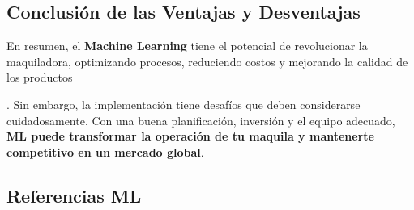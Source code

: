 \documentclass[
  10pt,
  letterpaper,
]{book}
\begin{document}
\subsection{Conclusión de las Ventajas y
Desventajas}\label{conclusiuxf3n-de-las-ventajas-y-desventajas}

En resumen, el \textbf{Machine Learning} tiene el potencial de
revolucionar la maquiladora, optimizando procesos, reduciendo costos y
mejorando la calidad de los productos

. Sin embargo, la implementación tiene desafíos que deben considerarse
cuidadosamente. Con una buena planificación, inversión y el equipo
adecuado, \textbf{ML puede transformar la operación de tu maquila y
mantenerte competitivo en un mercado global}.

\subsection{Referencias ML}\label{referencias-ml}
\end{document}
